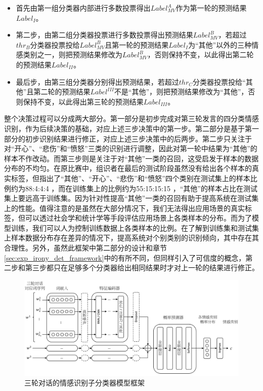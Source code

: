 \begin{itemize}

\item 首先由第一组分类器内部进行多数投票得出$Label^{A}_{MV}$作为第一轮的预测结果$Label_{I}$。

\item 第二步，由第二组分类器投票进行多数投票得出预测结果$Label^{B}_{MV}$，若超过$thr_{B}$分类器投票投给$Label^{B}_{MV}$且第一轮的预测结果$Label_{I}$为“其他”以外的三种情感类别之一，则把预测结果修改为$Label^{B}_{MV}$，否则保持不变，以此得出第二轮的预测结果$Label_{II}$。

\item 最后步，由第三组分类器分别得出预测结果，若超过$thr_{C}$分类器投票投给“其他”且第二轮的预测结果$Label^{III}$不是“其他”，则把预测结果修改为“其他”，否则保持不变，以此得出第三轮的预测结果$Label_{III}$。

\end{itemize}

整个决策过程可以分成两大部分。第一部分是初步完成对第三轮发言的四分类情感识别，作为后续决策的基础，对应上述三步决策中的第一步。第二部分是基于第一部分的初步识别结果进行修正，对应上述三步决策中的后两步。第二步只关注于对“开心”、“悲伤”和“愤怒”三类的识别进行调整，因此对第一轮中结果为“其他”的样本不作改动。而第三步则是关注于对“其他”一类的召回，这受启发于样本的数据分布的不均匀。在原比赛中，组识者在最后的测试阶段虽然没有给出各个样本的真实标签，但指出了“其他”、“开心”、“悲伤”和“愤怒”四个类别在测试集上的样本比例约为88:4:4:4 ，而在训练集上的比例约为55:15:15:15 ，“其他”的样本占比在测试集上要远高于训练集。因为针对性提高“其他”一类的召回有助于提高系统在测试集上的性能。值得注意的是虽然在大部分情况下，我们无法得出应用场景的真实标签，但可以透过社会学和统计学等手段评估应用场景上各类样本的分布。而为了模型训练，我们可以人为控制训练数据上各类样本的比例。在了解到训练集和测试集上样本数据分布存在差异的情况下，提高系统对个别类别的识别倾向，其中存在其合理性。另外，虽然此框架中第二部分的设计和章节\ref{sec:exp_irony_det_framework}中的有所不同，但同样引入了可信度的概念，第二步和第三步都只在足够多个分类器给出相同结果时才对上一轮的结果进行修正。

\begin{figure}[H]
  \centering
  \includegraphics[width=\textwidth]{img/context_emo_cls_framework.pdf}
  \caption{三轮对话的情感识别子分类器模型框架}
  \label{fig:context_emo_cls_framework}
\end{figure}

